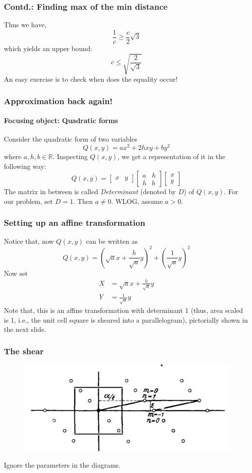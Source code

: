 \documentclass{beamer}
\begin{document}
    \begin{frame}
        \frametitle{Contd.: Finding max of the min distance}
        Thus we have, \[\frac{1}{c} \geq \frac{c}{2}\sqrt{3}\] which yields an upper bound: \[c \leq \sqrt{\frac{2}{\sqrt{3}}}\]
        An easy exercise is to check when does the equality occur!
    \end{frame}

    \begin{frame}
        \frametitle{Approximation back again!}
        \framesubtitle{Focusing object: Quadratic forms}
        Consider the quadratic form of two variables \[Q(x,y) = ax^2 + 2hxy + by^2\] where \(a,h,b \in \mathbb{R}\). Inspecting \(Q(x,y)\), we get a representation of it in the following way: \[Q(x,y) = \begin{bmatrix}
            x & y
        \end{bmatrix}
        \begin{bmatrix}
            a & h \\
            h & b
        \end{bmatrix}
        \begin{bmatrix}
            x \\
            y
        \end{bmatrix}\]
        The matrix in between is called \emph{Determinant} (denoted by \(D\)) of \(Q(x,y)\). For our problem, set \(D = 1\). Then \(a \neq 0\). WLOG, assume \(a > 0\).
    \end{frame}

    \begin{frame}
        \frametitle{Setting up an affine transformation}
        Notice that, now \(Q(x,y)\) can be written as \[Q(x,y) = \left(\sqrt{a}x + \frac{h}{\sqrt{a}}y\right)^2 + \left(\frac{1}{\sqrt{a}}y\right)^2\]
        Now set 
        \begin{align*}
            X &= \sqrt{a}x + \frac{h}{\sqrt{a}}y \\
            Y &= \frac{1}{\sqrt{a}}y
        \end{align*}
        Note that, this is an affine transformation with determinant 1 (thus, area scaled is 1, i.e., the unit cell square is sheared into a parallelogram), pictorially shown in the next slide.
    \end{frame}

    \begin{frame}
        \frametitle{The shear}
        \begin{figure}
            \includegraphics[scale=0.29]{shear.png}
        \end{figure}
        Ignore the parameters in the diagrams.
    \end{frame}
\end{document}
